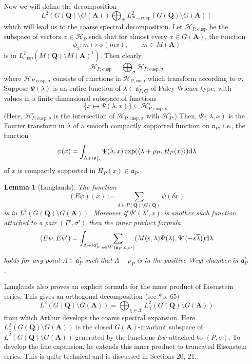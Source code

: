 \documentclass[11pt]{amsart}
\def\A{\mathbf A}
\def\C{\mathbf C}
\def\Q{\mathbf Q}
\def\HHH{\mathcal H}
\def\PPP{\mathcal P}
\def\XXX{\mathcal X}
\def\aaa{\mathfrak a}
\def\d{\text d}
\def\bs{\setminus} 			%
\def\cusp{\text{cusp}}
\def\Ltwo{L^2}
\def\sprod#1#2{\left\langle #1 , #2 \right\rangle}  %
\newtheorem{lemma}[theorem]{Lemma}
\theoremstyle{remark}
\begin{document}
Now we will define the decomposition
\[ \Ltwo(G(\Q)\bs G(\A)) \bigoplus_\PPP \Ltwo_{\PPP-\cusp}(G(\Q)\bs G(\A)) \]
which will lead us to the coarse spectral decomposition. Let $\HHH_{P, \cusp}$ be the subspace of vectors $\phi \in \HHH_P$ such that for almost every $x \in G(\A)$, the function
\[ \phi_x : m \mapsto \phi(mx) , \qquad m \in M(\A) \]
is in $\Ltwo_{\cusp}(M(\Q)\bs M(\A)^1)$. Then clearly,
\[ \HHH_{P, \cusp} = \bigoplus_\sigma \HHH_{P, \cusp, \sigma} \]
where $\HHH_{P, \cusp, \sigma}$ consists of functions in $\HHH_{P, \cusp}$ which transform according to $\sigma$. Suppose $\Psi(\lambda)$ is an entire function of $\lambda \in \aaa_{P, \C}^*$ of Paley-Wiener type, with values in a finite dimensional subspace of functions
\[ \{ x \mapsto \Psi(\lambda, x) \} \subseteq \HHH_{P, \cusp, \sigma}^\circ. \]
(Here, $\HHH_{P, \cusp, \sigma}^\circ$ is the intersection of $\HHH_{P, \cusp, \sigma}$ with $\HHH_P^\circ$.) Then, $\Psi(\lambda, x)$ is the Fourier transform in $\lambda$ of a smooth compactly supported function on $\aaa_P$, i.e., the function
\[ \psi(x) = \int_{\Lambda + i\aaa_P^*} \Psi(\lambda, x) \exp(\sprod{\lambda + \rho_P}{H_P(x)}) \d \lambda \]
of $x$ is compactly supported in $H_P(x) \in \aaa_P$. 
\begin{lemma} [Langlands]
	The function 
	\[ (E\psi)(x) := \sum_{\delta \in P(\Q)\bs G(\Q)} \psi(\delta x) \]
	is in $\Ltwo(G(\Q)\bs G(\A))$. Moreover if $\Psi'(\lambda', x)$ is another such function attached to a pair $(P', \sigma')$ then the inner product formula
	\[ (E\psi, E\psi') = \int_{\Lambda + i\aaa_P^*} \sum_{s \in W(\aaa_P, \aaa_{P'})}
				(M(s, \lambda)\Psi(\lambda), \Psi'(-s\overline \lambda)) \d \lambda \]
	holds for any point $\Lambda \in \aaa_P^*$ such that $\Lambda - \rho_P$ is in the positive Weyl chamber in $\aaa_P^*$. 
\end{lemma}

Langlands also proves an explicit formula for the inner product of Eisenstein series. This gives an orthogonal decomposition (see \cite{clay}*{p. 65})
\begin{equation} \label{hpchi}
	\Ltwo(G(\Q)\bs G(\A)) = \bigoplus_{\chi \in \XXX} \Ltwo_\chi(G(\Q)\bs G(\A))
\end{equation}
from which Arthur develops the coarse spectral expansion. Here $\Ltwo_\chi(G(\Q)\bs G(\A))$ is the closed $G(\A)$-invariant subspace of $\Ltwo(G(\Q)\bs G(\A))$ generated by the functions $E\psi$ attached to $(P, \sigma)$. To develop the fine expansion, he extends this inner product to truncated Eisenstein series. This is quite technical and is discussed in Sections 20, 21. 
\end{document}
